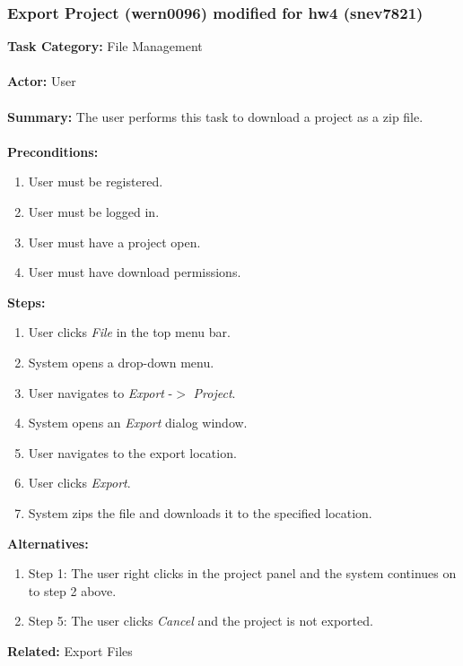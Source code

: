 \documentclass[11pt]{report}
\begin{document}
\subsubsection{Export Project (wern0096) modified for hw4 (snev7821)}
\begin{framed}

	\textbf{Task Category:} File Management \\ \\
	\textbf{Actor:} User \\ \\
	\textbf{Summary:} The user performs this task to download a project as a zip file. \\ \\
	\textbf{Preconditions:} 
	\begin{enumerate}
		\item User must be registered.
		\item User must be logged in.
		\item User must have a project open.
		\item User must have download permissions.
	\end{enumerate}
	\textbf{Steps:}
	\begin{enumerate}
		\item User clicks \textit{File} in the top menu bar.
		\item System opens a drop-down menu.
		\item User navigates to \textit{Export} -$>$ \textit{Project}.
		\item System opens an \textit{Export} dialog window.
		\item User navigates to the export location.
		\item User clicks \textit{Export}.
		\item System zips the file and downloads it to the specified location.
	\end{enumerate}
	\textbf{Alternatives:} 
	\begin{enumerate}
		\item Step 1: The user right clicks in the project panel and the system continues on to step 2 above.
		\item Step 5: The user clicks \textit{Cancel} and the project is not exported.
	\end{enumerate}
	\textbf{Related:} Export Files
\end{framed}

\newpage
\end{document}
